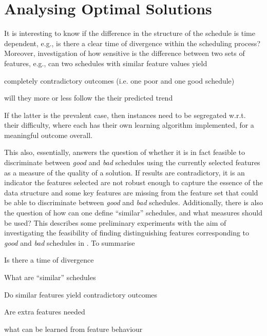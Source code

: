 
\chapter{Analysing Optimal Solutions}\label{ch:analysingopt} 

It is interesting to know if the difference in the structure of the schedule is 
time dependent, e.g.,  is there a clear time of divergence within the 
scheduling process? 
Moreover, investigation of how sensitive is the difference between two sets of 
features, e.g., can two schedules with similar feature values yield 
\begin{enumerate*}[label={{}}, 
    itemjoin={{? }}, itemjoin*={{? Or }}, after={{? }}]
    \item completely contradictory outcomes (i.e. one poor and one good 
    schedule)
    \item will they more or less follow the their predicted trend
\end{enumerate*}
If the latter is the prevalent case, then instances need to be segregated 
w.r.t. their difficulty, where each has their own learning algorithm 
implemented, for a meaningful outcome overall.  

This also, essentially, answers the question of whether  it is in fact feasible 
to discriminate between \emph{good} and \emph{bad} schedules using the 
currently selected features as a measure of the quality of a solution. 
If results are contradictory, it is an indicator the features selected are not 
robust enough to capture the essence of the data structure and some key 
features are missing from the feature set that could be able to discriminate 
between \emph{good} and \emph{bad} schedules. 
Additionally, there is also the question of how can one define ``similar'' 
schedules, and what measures should be used? This 
 describes some preliminary experiments with 
the aim of investigating the feasibility of finding distinguishing features 
corresponding to \emph{good} and \emph{bad} schedules in \jsp. To summarise
\begin{enumerate*}[itemjoin={{? }}, itemjoin*={{? And }}, after={{? }}]
    \item Is there a time of divergence
    \item What are ``similar'' schedules
    \item Do similar features yield contradictory outcomes
    \item Are extra features needed
    \item what can be learned from feature behaviour
\end{enumerate*}


